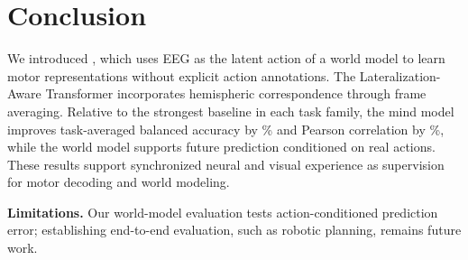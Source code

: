 \section{Conclusion}

We introduced \mwm{}, which uses EEG as the latent action of a world model to learn motor representations without explicit action annotations. The Lateralization-Aware Transformer incorporates hemispheric correspondence through frame averaging. Relative to the strongest baseline in each task family, the mind model improves task-averaged balanced accuracy by \mwmClsGainPct{}\% and Pearson correlation by \mwmRegGainPct{}\%, while the world model supports future prediction conditioned on real actions. These results support synchronized neural and visual experience as supervision for motor decoding and world modeling.

\noindent\textbf{Limitations.} Our world-model evaluation tests action-conditioned prediction error; establishing end-to-end evaluation, such as robotic planning, remains future work.

